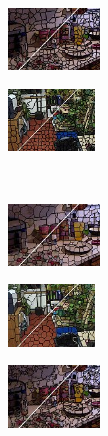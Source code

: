 \begin{figure}
	\begin{subfigure}[b]{0.1375\textwidth}
		\includegraphics[height=1.65cm]{pictures/nyuv2/tp/cropped/tp_00000561_contours}
	\end{subfigure}
	\begin{subfigure}[b]{0.129\textwidth}
		\includegraphics[height=1.65cm]{pictures/sunrgbd/tp/cropped/tp_00004732_contours}
	\end{subfigure}\\
	\begin{subfigure}[b]{0.02\textwidth}
	\end{subfigure}
	\begin{subfigure}[b]{0.1375\textwidth}
		\includegraphics[height=1.65cm]{pictures/nyuv2/cis/cropped/cis_00000561_contours}
	\end{subfigure}
	\begin{subfigure}[b]{0.129\textwidth}
		\includegraphics[height=1.65cm]{pictures/sunrgbd/cis/cropped/cis_00004732_contours}
	\end{subfigure}
	\begin{subfigure}[b]{0.02\textwidth}
	\end{subfigure}
	\begin{subfigure}[b]{0.1375\textwidth}
		\includegraphics[height=1.65cm]{pictures/nyuv2/slic/cropped/slic_00000561_contours}

\end{subfigure}
\end{figure}
